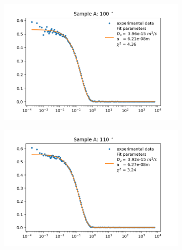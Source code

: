 \documentclass[]{article}
\begin{document}
\begin{figure}[!h]
\medskip
\begin{subfigure}{0.48\textwidth}
\includegraphics[width=\linewidth]{Plots/A/100.png}
\end{subfigure}
\begin{subfigure}[c]{0.48\linewidth}
\includegraphics[width=\linewidth]{Plots/A/110.png}
\end{subfigure}


\end{figure}
\end{document}
